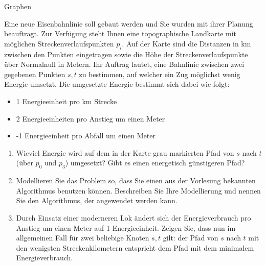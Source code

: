 \documentclass{article}
\begin{document}
\begin{exercise}{Graphen}
  
  Eine neue Eisenbahnlinie soll gebaut werden und Sie wurden mit ihrer Planung beauftragt. Zur Verfügung steht Ihnen eine topographische Landkarte mit möglichen Streckenverlaufspunkten $p_i$. Auf der Karte sind die Distanzen in km zwischen den Punkten eingetragen sowie die Höhe der Streckenverlaufspunkte über Normalnull in Metern. Ihr Auftrag lautet, eine Bahnlinie zwischen zwei gegebenen Punkten $s, t$ zu bestimmen, auf welcher ein Zug möglichst wenig Energie umsetzt. Die umgesetzte Energie bestimmt sich dabei wie folgt:
  \begin{itemize}
    \item 1 Energieeinheit pro km Strecke
    \item 2 Energieeinheiten pro Anstieg um einen Meter
    \item -1 Energieeinheit pro Abfall um einen Meter
  \end{itemize}
  \begin{enumerate}
    \item Wieviel Energie wird auf dem in der Karte grau markierten Pfad von $s$ nach $t$ (über $p_0$ und $p_3$) umgesetzt? Gibt es einen energetisch günstigeren Pfad?
    \item Modellieren Sie das Problem so, dass Sie einen aus der Vorlesung bekannten Algorithmus benutzen können. Beschreiben Sie Ihre Modellierung und nennen Sie den Algorithmus, der angewendet werden kann.
    \item Durch Einsatz einer moderneren Lok ändert sich der Energieverbrauch pro Anstieg um einen Meter auf 1 Energieeinheit. Zeigen Sie, dass nun im allgemeinen Fall für zwei beliebige Knoten $s, t$ gilt: der Pfad von $s$ nach $t$ mit den wenigsten Streckenkilometern entspricht dem Pfad mit dem minimalem Energieverbrauch.
  \end{enumerate}


\end{exercise}
\end{document}
